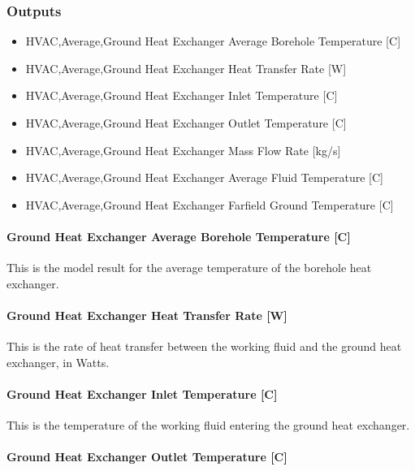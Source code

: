 \subsubsection{Outputs}\label{outputs-10-000}

\begin{itemize}
\item
  HVAC,Average,Ground Heat Exchanger Average Borehole Temperature {[}C{]}
\item
  HVAC,Average,Ground Heat Exchanger Heat Transfer Rate {[}W{]}
\item
  HVAC,Average,Ground Heat Exchanger Inlet Temperature {[}C{]}
\item
  HVAC,Average,Ground Heat Exchanger Outlet Temperature {[}C{]}
\item
  HVAC,Average,Ground Heat Exchanger Mass Flow Rate {[}kg/s{]}
\item
  HVAC,Average,Ground Heat Exchanger Average Fluid Temperature {[}C{]}
\item
  HVAC,Average,Ground Heat Exchanger Farfield Ground Temperature {[}C{]}
\end{itemize}

\paragraph{Ground Heat Exchanger Average Borehole Temperature {[}C{]}}\label{ground-heat-exchanger-average-borehole-temperature-c}

This is the model result for the average temperature of the borehole heat exchanger.

\paragraph{Ground Heat Exchanger Heat Transfer Rate {[}W{]}}\label{ground-heat-exchanger-heat-transfer-rate-w}

This is the rate of heat transfer between the working fluid and the ground heat exchanger, in Watts.

\paragraph{Ground Heat Exchanger Inlet Temperature {[}C{]}}\label{ground-heat-exchanger-inlet-temperature-c}

This is the temperature of the working fluid entering the ground heat exchanger.

\paragraph{Ground Heat Exchanger Outlet Temperature {[}C{]}}\label{ground-heat-exchanger-outlet-temperature-c}

